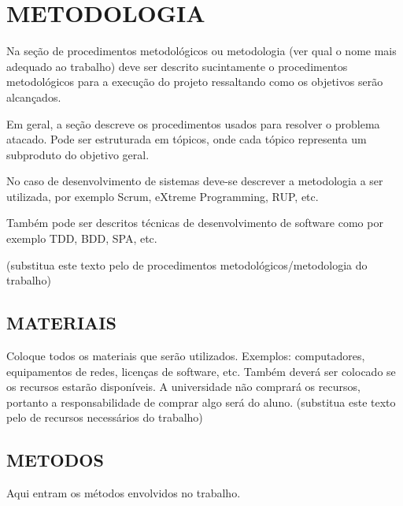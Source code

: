 {\let\clearpage\relax \chapter{METODOLOGIA}}
\label{chap:metodologia}

Na seção de procedimentos metodológicos ou metodologia (ver qual o nome mais adequado ao trabalho) deve ser descrito sucintamente o procedimentos metodológicos para a execução do projeto ressaltando como os objetivos serão alcançados. 

Em geral, a seção descreve os procedimentos usados para resolver o problema atacado. Pode ser estruturada em tópicos, onde cada tópico representa um subproduto do objetivo geral.

No caso de desenvolvimento de sistemas deve-se descrever a metodologia a ser utilizada, por exemplo Scrum, eXtreme Programming, RUP, etc. 

Também pode ser descritos técnicas de desenvolvimento de software como por exemplo TDD, BDD, SPA,  etc.

(substitua este texto pelo de procedimentos metodológicos/metodologia do trabalho)

\section{MATERIAIS}
\label{sec:materiais}
Coloque todos os materiais que serão utilizados. Exemplos: computadores, equipamentos de redes, licenças de software, etc. Também deverá ser colocado se os recursos estarão disponíveis. A universidade não comprará os recursos, portanto a responsabilidade de comprar algo será do aluno. (substitua este texto pelo de recursos necessários do trabalho)

\section{METODOS}
\label{sec:metodos}
Aqui entram os métodos envolvidos no trabalho. \\ \\



